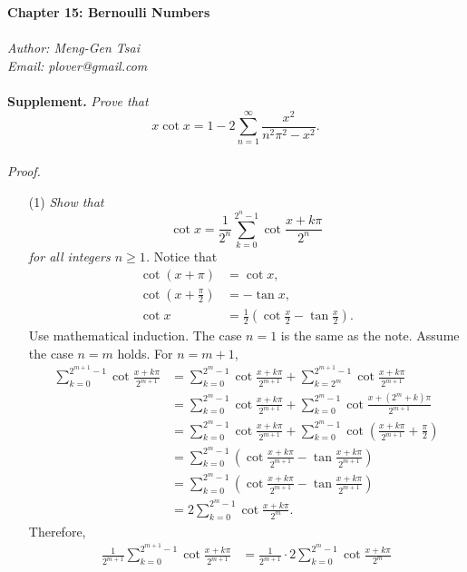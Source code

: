 \documentclass{article}
\begin{document}
\textbf{\Large Chapter 15: Bernoulli Numbers} \\\\



\emph{Author: Meng-Gen Tsai} \\
\emph{Email: plover@gmail.com} \\\\



\textbf{Supplement.}
\emph{Prove that $$x \cot x = 1 - 2 \sum_{n=1}^{\infty} \frac{x^2}{n^2 \pi^2 - x^2}.$$} \\

\emph{Proof.}
\begin{enumerate}
\item[(1)]
\emph{Show that $$\cot x
= \frac{1}{2^n} \sum_{k=0}^{2^{n} - 1} \cot \frac{x + k\pi}{2^n}$$
for all integers $n \geq 1$.}
Notice that
\begin{align*}
\cot(x + \pi) &= \cot x, \\
\cot\left( x + \frac{\pi}{2} \right) &= -\tan x, \\
\cot x &= \frac{1}{2} \left( \cot\frac{x}{2} - \tan\frac{x}{2} \right).
\end{align*}
Use mathematical induction.
The case $n = 1$ is the same as the note.
Assume the case $n = m$ holds.
For $n = m+1$,
\begin{align*}
\sum_{k=0}^{2^{m+1} - 1} \cot \frac{x + k\pi}{2^{m+1}}
&= \sum_{k=0}^{2^{m} - 1} \cot \frac{x + k\pi}{2^{m+1}}
+ \sum_{k=2^{m}}^{2^{m+1} - 1} \cot \frac{x + k\pi}{2^{m+1}} \\
&= \sum_{k=0}^{2^{m} - 1} \cot \frac{x + k\pi}{2^{m+1}}
+ \sum_{k=0}^{2^{m} - 1} \cot \frac{x + (2^{m} + k)\pi}{2^{m+1}} \\
&= \sum_{k=0}^{2^{m} - 1} \cot \frac{x + k\pi}{2^{m+1}}
+ \sum_{k=0}^{2^{m} - 1} \cot \left( \frac{x + k\pi}{2^{m+1}} + \frac{\pi}{2} \right) \\
&= \sum_{k=0}^{2^{m} - 1}
\left( \cot \frac{x + k\pi}{2^{m+1}} - \tan \frac{x + k\pi}{2^{m+1}} \right) \\
&= \sum_{k=0}^{2^{m} - 1}
\left( \cot \frac{x + k\pi}{2^{m+1}} - \tan \frac{x + k\pi}{2^{m+1}} \right) \\
&= 2 \sum_{k=0}^{2^{m} - 1} \cot \frac{x + k\pi}{2^{m}}.
\end{align*}
Therefore,
\begin{align*}
\frac{1}{2^{m+1}} \sum_{k=0}^{2^{m+1} - 1} \cot \frac{x + k\pi}{2^{m+1}}
&= \frac{1}{2^{m+1}} \cdot 2 \sum_{k=0}^{2^{m} - 1} \cot \frac{x + k\pi}{2^{m}} \\

\end{align*}
\end{enumerate}
\end{document}
